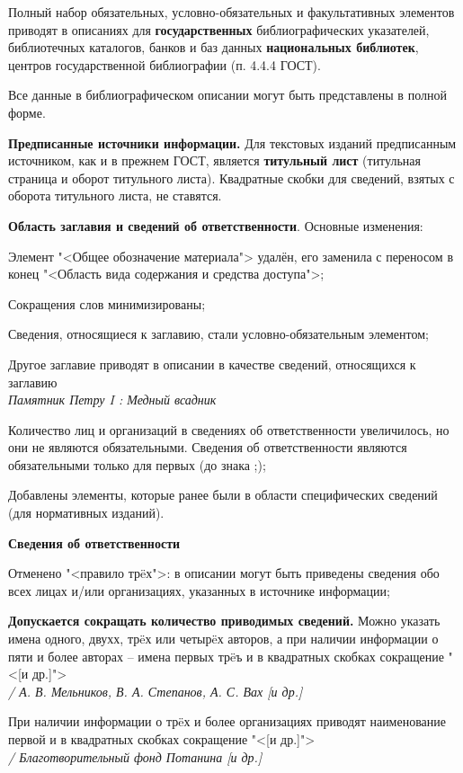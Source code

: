 Полный набор обязательных, условно-обязательных и факультативных элементов приводят в описаниях для \textbf{государственных} библиографических указателей, библиотечных каталогов, банков и баз данных \textbf{национальных библиотек}, центров государственной библиографии (п. 4.4.4 ГОСТ).

Все данные в библиографическом описании могут быть представлены в полной форме.

\textbf{Предписанные источники информации.} Для текстовых изданий предписанным источником, как и в прежнем ГОСТ, является \textbf{титульный лист} (титульная страница и оборот титульного листа). Квадратные скобки для сведений, взятых с оборота титульного листа, не ставятся.

\textbf{Область заглавия и сведений об ответственности}. Основные изменения:

\begin{cutelist}
    \item Элемент "<Общее обозначение материала"> удалён, его заменила с переносом в конец "<Область вида содержания и средства доступа">;
    \item Сокращения слов минимизированы;
    \item Сведения, относящиеся к заглавию, стали условно-обязательным элементом;
    \item Другое заглавие приводят в описании в качестве сведений, относящихся к заглавию\\
    \textsl{Памятник Петру I : Медный всадник}
    \item Количество лиц и организаций в сведениях об ответственности увеличилось, но они не являются обязательными. Сведения об ответственности являются обязательными только для первых (до знака ;);
    \item Добавлены элементы, которые ранее были в области специфических сведений (для нормативных изданий).
\end{cutelist}

\textbf{Сведения об ответственности}

\begin{cutelist}
    \item Отменено "<правило тр\"eх">: в описании могут быть приведены сведения обо всех лицах и/или организациях, указанных в источнике информации;
    \item \textbf{Допускается сокращать количество приводимых сведений.} Можно указать имена одного, двухх, тр\"eх или четыр\"eх авторов, а при наличии информации о пяти и более авторах -- имена первых тр\"eъ и в квадратных скобках сокращение "<{[}и др.{]}">\\
    \textsl{/ А. В. Мельников, В. А. Степанов, А. С. Вах {[}и др.{]}}
    \item При наличии информации о тр\"eх и более организациях приводят наименование первой и в квадратных скобках сокращение "<{[}и др.{]}">\\
    \textsl{/ Благотворительный фонд Потанина {[}и др.{]}}
\end{cutelist}

